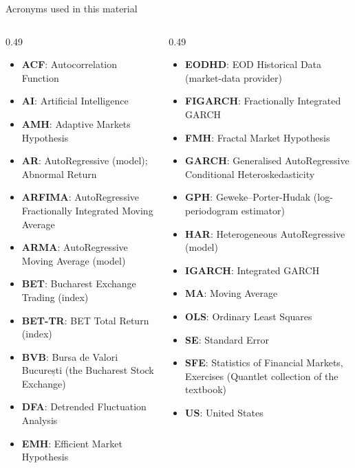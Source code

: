 \begin{frame}{Acronyms used in this material}
\begin{columns}[T]
\begin{column}{0.49\textwidth}
\begin{itemize}\setlength{\itemsep}{0pt}
    \item \textbf{ACF}: Autocorrelation Function
    \item \textbf{AI}: Artificial Intelligence
    \item \textbf{AMH}: Adaptive Markets Hypothesis
    \item \textbf{AR}: AutoRegressive (model); Abnormal Return
    \item \textbf{ARFIMA}: AutoRegressive Fractionally Integrated Moving Average
    \item \textbf{ARMA}: AutoRegressive Moving Average (model)
    \item \textbf{BET}: Bucharest Exchange Trading (index)
    \item \textbf{BET-TR}: BET Total Return (index)
    \item \textbf{BVB}: Bursa de Valori București (the Bucharest Stock Exchange)
    \item \textbf{DFA}: Detrended Fluctuation Analysis
    \item \textbf{EMH}: Efficient Market Hypothesis
\end{itemize}
\end{column}
\begin{column}{0.49\textwidth}
\begin{itemize}\setlength{\itemsep}{0pt}
    \item \textbf{EODHD}: EOD Historical Data (market-data provider)
    \item \textbf{FIGARCH}: Fractionally Integrated GARCH
    \item \textbf{FMH}: Fractal Market Hypothesis
    \item \textbf{GARCH}: Generalised AutoRegressive Conditional Heteroskedasticity
    \item \textbf{GPH}: Geweke–Porter-Hudak (log-periodogram estimator)
    \item \textbf{HAR}: Heterogeneous AutoRegressive (model)
    \item \textbf{IGARCH}: Integrated GARCH
    \item \textbf{MA}: Moving Average
    \item \textbf{OLS}: Ordinary Least Squares
    \item \textbf{SE}: Standard Error
    \item \textbf{SFE}: Statistics of Financial Markets, Exercises (Quantlet collection of the textbook)
    \item \textbf{US}: United States
\end{itemize}
\end{column}
\end{columns}
\end{frame}

